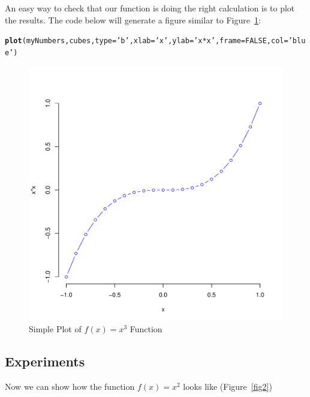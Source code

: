 \documentclass[10pt]{article}\usepackage[]{graphicx}\usepackage[]{color}
\makeatletter
\newcommand{\hlnum}[1]{\textcolor[rgb]{0.686,0.059,0.569}{#1}}%
\newcommand{\hlstr}[1]{\textcolor[rgb]{0.192,0.494,0.8}{#1}}%
\newcommand{\hlstd}[1]{\textcolor[rgb]{0.345,0.345,0.345}{#1}}%
\newcommand{\hlkwc}[1]{\textcolor[rgb]{0.333,0.667,0.333}{#1}}%
\newcommand{\hlkwd}[1]{\textcolor[rgb]{0.737,0.353,0.396}{\textbf{#1}}}%
\newenvironment{kframe}{%
 \def\at@end@of@kframe{}%
 \ifinner\ifhmode%
  \def\at@end@of@kframe{\end{minipage}}%
  \begin{minipage}{\columnwidth}%
 \fi\fi%
 \def\FrameCommand##1{\hskip\@totalleftmargin \hskip-\fboxsep
 \colorbox{shadecolor}{##1}\hskip-\fboxsep
     \hskip-\linewidth \hskip-\@totalleftmargin \hskip\columnwidth}%
 \MakeFramed {\advance\hsize-\width
   \@totalleftmargin\z@ \linewidth\hsize
   \@setminipage}}%
 {\par\unskip\endMakeFramed%
 \at@end@of@kframe}
\newenvironment{knitrout}{}{} %
\makeatother
\begin{document}
An easy way to check that our function is doing the right calculation is to plot the results. The code below will generate a figure similar to Figure~\ref{fig1}: 
\begin{knitrout}
\color{fgcolor}\begin{kframe}
\begin{alltt}
\hlkwd{plot}\hlstd{(myNumbers,cubes,}\hlkwc{type}\hlstd{=}\hlstr{'b'}\hlstd{,}\hlkwc{xlab} \hlstd{=} \hlstr{'x'}\hlstd{,} \hlkwc{ylab} \hlstd{=} \hlstr{'x*x'}\hlstd{,}\hlkwc{frame}\hlstd{=}\hlnum{FALSE}\hlstd{,}\hlkwc{col}\hlstd{=}\hlstr{'blue'}\hlstd{)}
\end{alltt}
\end{kframe}
\end{knitrout}


\begin{figure}[H] %
\begin{center}

\begin{knitrout}
\color{fgcolor}
\includegraphics[width=.47\linewidth]{figure/unnamed-chunk-5-1} 

\end{knitrout}

\caption {Simple Plot of $f(x)=x^3$ Function}
\label{fig1}
\end {center}
\end {figure}




\subsection{Experiments}\label{experiments}

Now we can show how the function $f(x)=x^2$ looks like (Figure~\ref{fig2})
\end{document}
